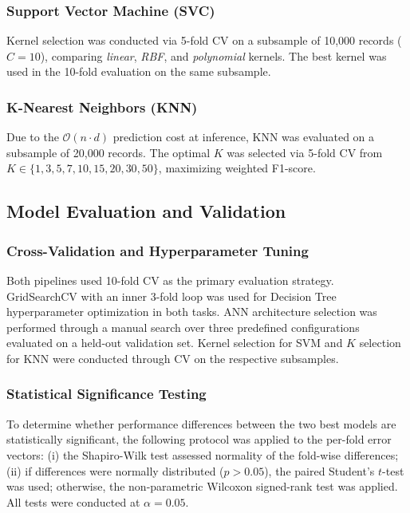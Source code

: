 \documentclass[conference]{IEEEtran}
\begin{document}
\subsubsection{Support Vector Machine (SVC)}
Kernel selection was conducted via 5-fold CV on a subsample of 10,000 records ($C=10$), comparing \textit{linear}, \textit{RBF}, and \textit{polynomial} kernels. The best kernel was used in the 10-fold evaluation on the same subsample.

\subsubsection{K-Nearest Neighbors (KNN)}
Due to the $\mathcal{O}(n \cdot d)$ prediction cost at inference, KNN was evaluated on a subsample of 20,000 records. The optimal $K$ was selected via 5-fold CV from $K \in \{1, 3, 5, 7, 10, 15, 20, 30, 50\}$, maximizing weighted F1-score.

\subsection{Model Evaluation and Validation}

\subsubsection{Cross-Validation and Hyperparameter Tuning}
Both pipelines used 10-fold CV as the primary evaluation strategy. GridSearchCV with an inner 3-fold loop was used for Decision Tree hyperparameter optimization in both tasks. ANN architecture selection was performed through a manual search over three predefined configurations evaluated on a held-out validation set. Kernel selection for SVM and $K$ selection for KNN were conducted through CV on the respective subsamples.

\subsubsection{Statistical Significance Testing}
To determine whether performance differences between the two best models are statistically significant, the following protocol was applied to the per-fold error vectors: (i) the Shapiro-Wilk test assessed normality of the fold-wise differences; (ii) if differences were normally distributed ($p > 0.05$), the paired Student's $t$-test was used; otherwise, the non-parametric Wilcoxon signed-rank test was applied. All tests were conducted at $\alpha = 0.05$.
\end{document}

